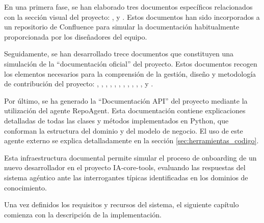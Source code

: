 En una primera fase, se han elaborado tres documentos específicos relacionados con la sección visual del proyecto: ,  y . Estos documentos han sido incorporados a un repositorio de Confluence para simular la documentación habitualmente proporcionada por los diseñadores del equipo.

Seguidamente, se han desarrollado trece documentos que constituyen una simulación de la ``documentación oficial'' del proyecto. Estos documentos recogen los elementos necesarios para la comprensión de la gestión, diseño y metodología de contribución del proyecto: , , , , , , , , , , ,  y .

Por último, se ha generado la ``Documentación API'' del proyecto mediante la utilización del agente RepoAgent\cite{luo_repoagent_2024}. Esta documentación contiene explicaciones detalladas de todas las clases y métodos implementados en Python, que conforman la estructura  del dominio y del modelo de negocio. El uso de este agente externo se explica detalladamente en la sección \ref{sec:herramientas_codigo}.

Esta infraestructura documental permite simular el proceso de onboarding de un nuevo desarrollador en el proyecto IA-core-tools, evaluando las respuestas del sistema agéntico ante las interrogantes típicas identificadas en los dominios de conocimiento.

Una vez definidos los requisitos y recursos del sistema, el siguiente capítulo comienza con la descripción de la implementación.







